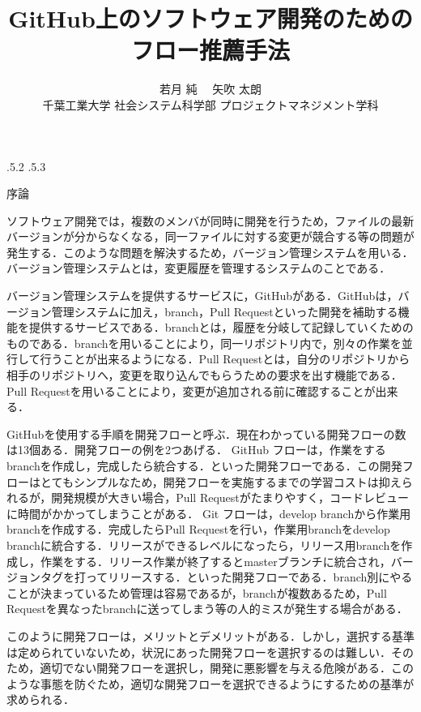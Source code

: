 \documentclass[uplatex,twocolumn]{jsarticle}
\title{\vspace{-14mm}GitHub上のソフトウェア開発のためのフロー推薦手法 \footnotemark[0]}
\author{若月 純 \footnotemark[2]　矢吹 太朗 \\ 千葉工業大学 社会システム科学部 プロジェクトマネジメント学科\footnotemark[2]}
\date{}%
\makeatletter
\renewcommand{\section}{%
    \if@slide\clearpage\fi
    \@startsection{section}{1}{\z@}%
    {\Cvs \@plus.5\Cdp \@minus.2\Cdp}%
    {.5\Cvs \@plus.3\Cdp}%
    {\normalfont\raggedright}}
\makeatother
\begin{document}
\twocolumn[
	\maketitle
]
\begingroup
\def\thefootnote{\fnsymbol{footnote}}
\endgroup

\section{序論}

ソフトウェア開発では，複数のメンバが同時に開発を行うため，ファイルの最新バージョンが分からなくなる，同一ファイルに対する変更が競合する等の問題が発生する．このような問題を解決するため，バージョン管理システムを用いる．バージョン管理システムとは，変更履歴を管理するシステムのことである\cite{ikeda2014}．

バージョン管理システムを提供するサービスに，GitHubがある．GitHubは，バージョン管理システムに加え，branch，Pull Requestといった開発を補助する機能を提供するサービスである．branchとは，履歴を分岐して記録していくためのものである．branchを用いることにより，同一リポジトリ内で，別々の作業を並行して行うことが出来るようになる．Pull Requestとは，自分のリポジトリから相手のリポジトリへ，変更を取り込んでもらうための要求を出す機能である．Pull Requestを用いることにより，変更が追加される前に確認することが出来る．

GitHubを使用する手順を開発フローと呼ぶ．現在わかっている開発フローの数は13個ある\cite{onodera2015}．開発フローの例を2つあげる．
GitHub フローは，作業をするbranchを作成し，完成したら統合する．といった開発フローである．この開発フローはとてもシンプルなため，開発フローを実施するまでの学習コストは抑えられるが，開発規模が大きい場合，Pull Requestがたまりやすく，コードレビューに時間がかかってしまうことがある．
Git フローは，develop branchから作業用branchを作成する．完成したらPull Requestを行い，作業用branchをdevelop branchに統合する．リリースができるレベルになったら，リリース用branchを作成し，作業をする．リリース作業が終了するとmasterブランチに統合され，バージョンタグを打ってリリースする．といった開発フローである．branch別にやることが決まっているため管理は容易であるが，branchが複数あるため，Pull Requestを異なったbranchに送ってしまう等の人的ミスが発生する場合がある\cite{ohtsuka2014}．

このように開発フローは，メリットとデメリットがある．しかし，選択する基準は定められていないため，状況にあった開発フローを選択するのは難しい．そのため，適切でない開発フローを選択し，開発に悪影響を与える危険がある．このような事態を防ぐため，適切な開発フローを選択できるようにするための基準が求められる．
\end{document}
